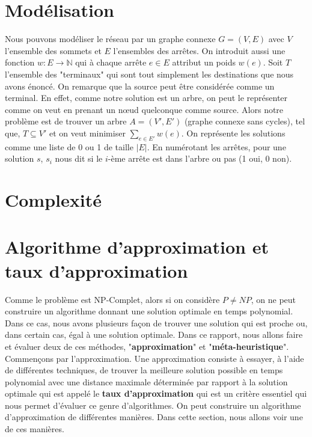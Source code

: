 \documentclass[11pt,french]{report}
\begin{document}
	\section{Modélisation\label{Modélisation}}
	Nous pouvons modéliser le réseau par un graphe connexe $G = (V, E)$ avec $V$ l'ensemble des sommets et $E$ l'ensembles des arrêtes. On introduit aussi une fonction $w:E\rightarrow \mathbb{N}$ qui à chaque arrête $e\in E$ attribut un poids $w(e)$. Soit $T$ l'ensemble des "terminaux" qui sont tout simplement les destinations que nous avons énoncé. On remarque que la source peut être considérée comme un terminal. En effet, comme notre solution est un arbre, on peut le représenter comme on veut en prenant un nœud quelconque comme source. Alors notre problème est de trouver un arbre $A = (V', E')$ (graphe connexe sans cycles), tel que, $T\subseteq V'$ et on veut minimiser \label{poids}{$\sum_{e\in E'}w(e)$}. On représente les solutions comme une liste de 0 ou 1 de taille $|E|$. En numérotant les arrêtes, pour une solution $s$, $s_i$ nous dit si le $i$-ème arrête est dans l'arbre ou pas (1 oui, 0 non).
	\section{Complexité\label{Complexité}}
	
	\section{Algorithme d'approximation et taux d'approximation\label{Approx}}
	Comme le problème est NP-Complet, alors si on considère $P\neq NP$, on ne peut construire un algorithme donnant une solution optimale en temps polynomial. Dans ce cas, nous avons plusieurs façon de trouver une solution qui est proche ou, dans certain cas, égal à une solution optimale. Dans ce rapport, nous allons faire et évaluer deux de ces méthodes, "\textbf{approximation}" et "\textbf{méta-heuristique}". Commençons par l'approximation. Une approximation consiste à essayer, à l'aide de différentes techniques, de trouver la meilleure solution possible en temps polynomial avec une distance maximale déterminée par rapport à la solution optimale qui est appelé le \textbf{taux d'approximation} qui est un critère essentiel qui nous permet d'évaluer ce genre d'algorithmes. On peut construire un algorithme d'approximation de différentes manières. Dans cette section, nous allons voir une de ces manières.
	
\end{document}
